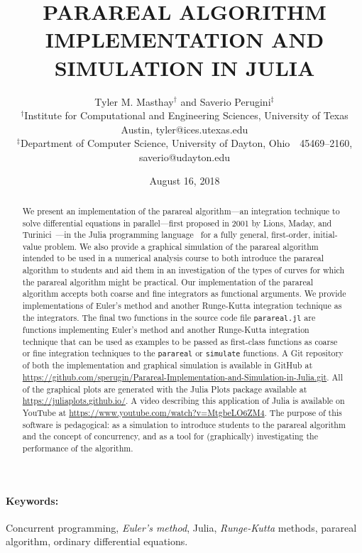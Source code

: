 \documentclass[12pt]{article}
\title{\normalsize \bfseries
PARAREAL ALGORITHM IMPLEMENTATION AND SIMULATION IN JULIA}
\author{\normalsize{Tyler M. Masthay$^{\dagger}$ and Saverio Perugini$^{\ddagger}$}\\
\scriptsize{$^{\dagger}$Institute for Computational and Engineering Sciences, University of Texas Austin, tyler@ices.utexas.edu}\\
\scriptsize{$^{\ddagger}$Department of Computer Science, University of Dayton,
Ohio\ \ 45469--2160, saverio@udayton.edu}}
\begin{document}
\sloppy
\date{\normalsize{August 16, 2018}}

\maketitle
\thispagestyle{empty}
\pagestyle{empty}

\begin{abstract} We present an implementation of the parareal algorithm—an
integration technique to solve diﬀerential equations in parallel---ﬁrst
proposed in 2001 by Lions, Maday, and Turinici~\cite{Lions:2001}---in the Julia
programming language~\cite{Julia:2014} for a fully general, ﬁrst-order,
initial-value problem.  We also provide a graphical simulation of the parareal
algorithm intended to be used in a numerical analysis course to both introduce
the parareal algorithm to students and aid them in an investigation of the
types of curves for which the parareal algorithm might be practical.  Our
implementation of the parareal algorithm accepts both coarse and ﬁne
integrators as functional arguments.  We provide implementations of Euler’s
method and another Runge-Kutta integration technique as the integrators.  The
final two functions in the source code file \texttt{parareal.jl} are functions
implementing Euler’s method and another Runge-Kutta integration technique that
can be used as examples to be passed as ﬁrst-class functions as coarse or ﬁne
integration techniques to the \texttt{parareal} or \texttt{simulate} functions.
A Git repository of both the implementation and graphical simulation is
available in GitHub at
\url{https://github.com/sperugin/Parareal-Implementation-and-Simulation-in-Julia.git}.
All of the graphical plots are generated with the Julia Plots package available
at \url{https://juliaplots.github.io/}.  A video describing this application of
Julia is available on YouTube at
\url{https://www.youtube.com/watch?v=MtgbeLO6ZM4}.  The purpose of this
software is pedagogical: as a simulation to introduce students to the parareal
algorithm and the concept of concurrency, and as a tool for (graphically)
investigating the performance of the algorithm.  \end{abstract}

\paragraph{Keywords:}
Concurrent programming,
\textit{Euler's method},
Julia,
\textit{Runge-Kutta} methods,
parareal algorithm,
ordinary differential equations.
\end{document}
